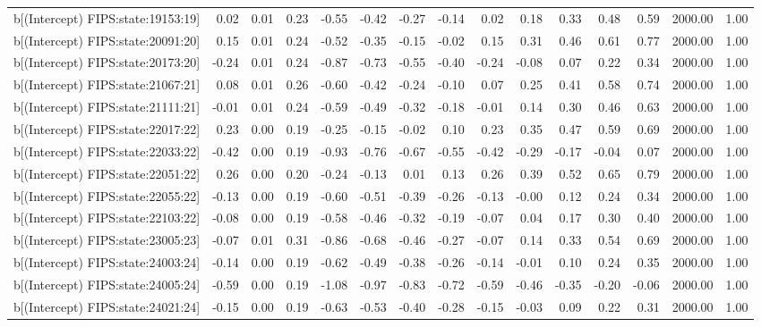 \begin{table}[ht]
\begin{tabular}{rrrrrrrrrrrrrrr}
  b[(Intercept) FIPS:state:19153:19] & 0.02 & 0.01 & 0.23 & -0.55 & -0.42 & -0.27 & -0.14 & 0.02 & 0.18 & 0.33 & 0.48 & 0.59 & 2000.00 & 1.00 \\ 
  b[(Intercept) FIPS:state:20091:20] & 0.15 & 0.01 & 0.24 & -0.52 & -0.35 & -0.15 & -0.02 & 0.15 & 0.31 & 0.46 & 0.61 & 0.77 & 2000.00 & 1.00 \\ 
  b[(Intercept) FIPS:state:20173:20] & -0.24 & 0.01 & 0.24 & -0.87 & -0.73 & -0.55 & -0.40 & -0.24 & -0.08 & 0.07 & 0.22 & 0.34 & 2000.00 & 1.00 \\ 
  b[(Intercept) FIPS:state:21067:21] & 0.08 & 0.01 & 0.26 & -0.60 & -0.42 & -0.24 & -0.10 & 0.07 & 0.25 & 0.41 & 0.58 & 0.74 & 2000.00 & 1.00 \\ 
  b[(Intercept) FIPS:state:21111:21] & -0.01 & 0.01 & 0.24 & -0.59 & -0.49 & -0.32 & -0.18 & -0.01 & 0.14 & 0.30 & 0.46 & 0.63 & 2000.00 & 1.00 \\ 
  b[(Intercept) FIPS:state:22017:22] & 0.23 & 0.00 & 0.19 & -0.25 & -0.15 & -0.02 & 0.10 & 0.23 & 0.35 & 0.47 & 0.59 & 0.69 & 2000.00 & 1.00 \\ 
  b[(Intercept) FIPS:state:22033:22] & -0.42 & 0.00 & 0.19 & -0.93 & -0.76 & -0.67 & -0.55 & -0.42 & -0.29 & -0.17 & -0.04 & 0.07 & 2000.00 & 1.00 \\ 
  b[(Intercept) FIPS:state:22051:22] & 0.26 & 0.00 & 0.20 & -0.24 & -0.13 & 0.01 & 0.13 & 0.26 & 0.39 & 0.52 & 0.65 & 0.79 & 2000.00 & 1.00 \\ 
  b[(Intercept) FIPS:state:22055:22] & -0.13 & 0.00 & 0.19 & -0.60 & -0.51 & -0.39 & -0.26 & -0.13 & -0.00 & 0.12 & 0.24 & 0.34 & 2000.00 & 1.00 \\ 
  b[(Intercept) FIPS:state:22103:22] & -0.08 & 0.00 & 0.19 & -0.58 & -0.46 & -0.32 & -0.19 & -0.07 & 0.04 & 0.17 & 0.30 & 0.40 & 2000.00 & 1.00 \\ 
  b[(Intercept) FIPS:state:23005:23] & -0.07 & 0.01 & 0.31 & -0.86 & -0.68 & -0.46 & -0.27 & -0.07 & 0.14 & 0.33 & 0.54 & 0.69 & 2000.00 & 1.00 \\ 
  b[(Intercept) FIPS:state:24003:24] & -0.14 & 0.00 & 0.19 & -0.62 & -0.49 & -0.38 & -0.26 & -0.14 & -0.01 & 0.10 & 0.24 & 0.35 & 2000.00 & 1.00 \\ 
  b[(Intercept) FIPS:state:24005:24] & -0.59 & 0.00 & 0.19 & -1.08 & -0.97 & -0.83 & -0.72 & -0.59 & -0.46 & -0.35 & -0.20 & -0.06 & 2000.00 & 1.00 \\ 
  b[(Intercept) FIPS:state:24021:24] & -0.15 & 0.00 & 0.19 & -0.63 & -0.53 & -0.40 & -0.28 & -0.15 & -0.03 & 0.09 & 0.22 & 0.31 & 2000.00 & 1.00 \\ 

\end{tabular}
\end{table}
